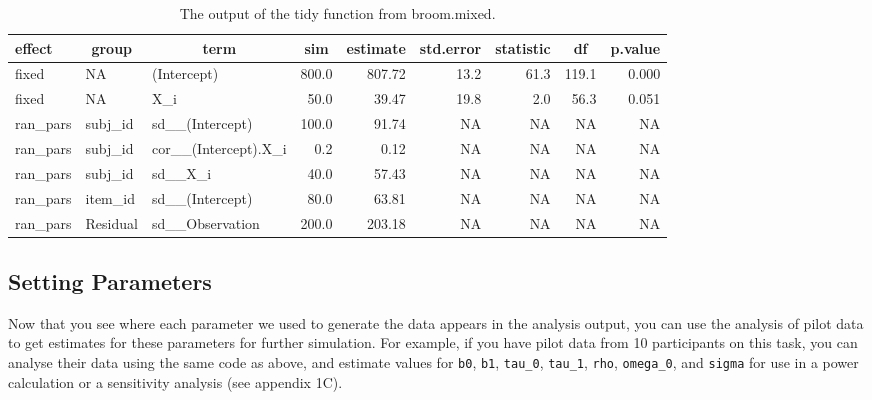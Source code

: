 \documentclass[english,doc,floatsintext]{apa6}
\begin{document}
\begin{table}[H]

\begin{center}
\begin{threeparttable}

\caption{\label{tab:broom-tidy-table}The output of the tidy function from broom.mixed.}

\footnotesize{

\begin{tabular}{lllrrrrrr}
\toprule
effect & \multicolumn{1}{c}{group} & \multicolumn{1}{c}{term} & \multicolumn{1}{c}{sim} & \multicolumn{1}{c}{estimate} & \multicolumn{1}{c}{std.error} & \multicolumn{1}{c}{statistic} & \multicolumn{1}{c}{df} & \multicolumn{1}{c}{p.value}\\
\midrule
fixed & NA & (Intercept) & 800.0 & 807.72 & 13.2 & 61.3 & 119.1 & 0.000\\
fixed & NA & X\_i & 50.0 & 39.47 & 19.8 & 2.0 & 56.3 & 0.051\\
ran\_pars & subj\_id & sd\_\_(Intercept) & 100.0 & 91.74 & NA & NA & NA & NA\\
ran\_pars & subj\_id & cor\_\_(Intercept).X\_i & 0.2 & 0.12 & NA & NA & NA & NA\\
ran\_pars & subj\_id & sd\_\_X\_i & 40.0 & 57.43 & NA & NA & NA & NA\\
ran\_pars & item\_id & sd\_\_(Intercept) & 80.0 & 63.81 & NA & NA & NA & NA\\
ran\_pars & Residual & sd\_\_Observation & 200.0 & 203.18 & NA & NA & NA & NA\\
\bottomrule
\end{tabular}

}

\end{threeparttable}
\end{center}

\end{table}

\hypertarget{setting-parameters}{%
\subsection{Setting Parameters}\label{setting-parameters}}

Now that you see where each parameter we used to generate the data appears in the analysis output, you can use the analysis of pilot data to get estimates for these parameters for further simulation. For example, if you have pilot data from 10 participants on this task, you can analyse their data using the same code as above, and estimate values for \texttt{b0}, \texttt{b1}, \texttt{tau\_0}, \texttt{tau\_1}, \texttt{rho}, \texttt{omega\_0}, and \texttt{sigma} for use in a power calculation or a sensitivity analysis (see appendix 1C).
\end{document}
